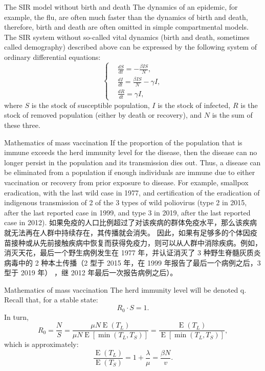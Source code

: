 \documentclass[
  notheorems,
  aspectratio=54,
]{beamer}
\begin{document}
\begin{frame}{The SIR model without birth and death}
  The dynamics of an epidemic, for example, the flu, are often much faster than the dynamics of birth and death, therefore, birth and death are often omitted in simple compartmental models. The SIR system without so-called vital dynamics (birth and death, sometimes called demography) described above can be expressed by the following system of ordinary differential equations:
  $${\displaystyle \left\{{\begin{aligned}&{\frac {dS}{dt}}=-{\frac {\beta IS}{N}},\\[6pt]&{\frac {dI}{dt}}={\frac {\beta IS}{N}}-\gamma I,\\[6pt]&{\frac {dR}{dt}}=\gamma I,\end{aligned}}\right.}$$
    where 
${\displaystyle S}$ is the stock of susceptible population, 
${\displaystyle I}$ is the stock of infected, 
${\displaystyle R}$ is the stock of removed population (either by death or recovery), and
${\displaystyle N}$ is the sum of these three.
\end{frame}

\begin{frame}{Mathematics of mass vaccination}
  If the proportion of the population that is immune exceeds the herd immunity level for the disease, then the disease can no longer persist in the population and its transmission dies out. Thus, a disease can be eliminated from a population if enough individuals are immune due to either vaccination or recovery from prior exposure to disease. For example, smallpox eradication, with the last wild case in 1977, and certification of the eradication of indigenous transmission of 2 of the 3 types of wild poliovirus (type 2 in 2015, after the last reported case in 1999, and type 3 in 2019, after the last reported case in 2012). 如果免疫的人口比例超过了对该疾病的群体免疫水平，那么该疾病就无法再在人群中持续存在，其传播就会消失。 因此，如果有足够多的个体因疫苗接种或从先前接触疾病中恢复而获得免疫力，则可以从人群中消除疾病。例如，消灭天花，最后一个野生病例发生在 1977 年，并认证消灭了 3 种野生脊髓灰质炎病毒中的 2 种本土传播（2 型于 2015 年，在 1999 年报告了最后一个病例之后，3 型于 2019 年） ，继 2012 年最后一次报告病例之后）。
\end{frame}

\begin{frame}{Mathematics of mass vaccination}
  The herd immunity level will be denoted q. Recall that, for a stable state:
$${\displaystyle R_{0}\cdot S=1.}$$
In turn,
$${\displaystyle R_{0}={\frac {N}{S}}={\frac {\mu N\operatorname {E} (T_{L})}{\mu N\operatorname {E} [\min(T_{L},T_{S})]}}={\frac {\operatorname {E} (T_{L})}{\operatorname {E} [\min(T_{L},T_{S})]}},}$$
which is approximately:
$${\displaystyle {\frac {\operatorname {\operatorname {E} } (T_{L})}{\operatorname {\operatorname {E} } (T_{S})}}=1+{\frac {\lambda }{\mu }}={\frac {\beta N}{v}}.}$$
\end{frame}
\end{document}
